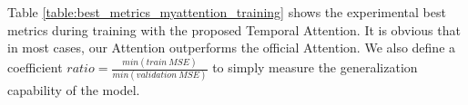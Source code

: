 \documentclass[sigconf]{acmart}
\begin{document}


Table \ref{table:best_metrics_myattention_training} shows the experimental best metrics during training with the proposed Temporal Attention. It is obvious that in most cases, our Attention outperforms the official Attention. We also define a coefficient $ratio=\frac{min(train\ MSE)}{min(validation\ MSE)}$ to simply measure the generalization capability of the model.
\end{document}
